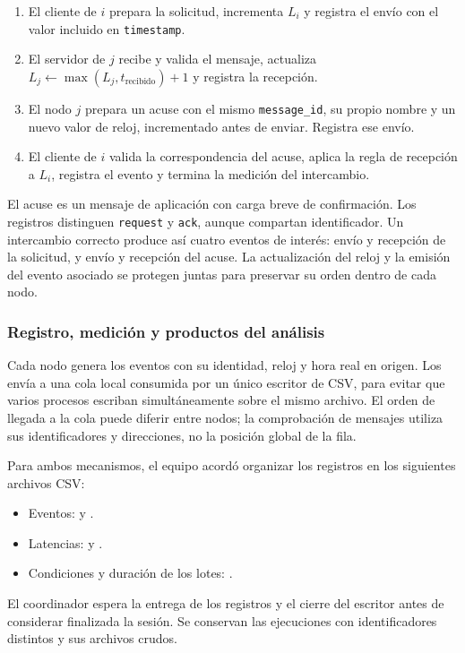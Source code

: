 \begin{enumerate}
    \item El cliente de $i$ prepara la solicitud, incrementa $L_i$ y registra el
    envío con el valor incluido en \texttt{timestamp}.
    \item El servidor de $j$ recibe y valida el mensaje, actualiza
    $L_j \leftarrow \max(L_j, t_{\mathrm{recibido}})+1$ y registra la recepción.
    \item El nodo $j$ prepara un acuse con el mismo \texttt{message\_id}, su propio
    nombre y un nuevo valor de reloj, incrementado antes de enviar. Registra ese envío.
    \item El cliente de $i$ valida la correspondencia del acuse, aplica la regla
    de recepción a $L_i$, registra el evento y termina la medición del intercambio.
\end{enumerate}

El acuse es un mensaje de aplicación con carga breve de confirmación. Los
registros distinguen \texttt{request} y \texttt{ack}, aunque compartan
identificador. Un intercambio correcto produce así cuatro eventos de interés:
envío y recepción de la solicitud, y envío y recepción del acuse. La actualización
del reloj y la emisión del evento asociado se protegen juntas para preservar su
orden dentro de cada nodo.

\subsubsection{Registro, medición y productos del análisis}

Cada nodo genera los eventos con su identidad, reloj y hora real en origen.
Los envía a una cola local consumida por un único escritor de CSV,
para evitar que varios procesos escriban simultáneamente sobre el mismo archivo.
El orden de llegada a la cola puede diferir entre nodos; la comprobación de mensajes
utiliza sus identificadores y direcciones, no la posición global de la fila.

Para ambos mecanismos, el equipo acordó organizar los registros en los siguientes
archivos CSV:
\begin{itemize}
    \item Eventos:  y .
    \item Latencias:  y .
    \item Condiciones y duración de los lotes: .
\end{itemize}
El coordinador espera la entrega de los registros y el cierre del escritor antes
de considerar finalizada la sesión. Se conservan las ejecuciones con
identificadores distintos y sus archivos crudos.

